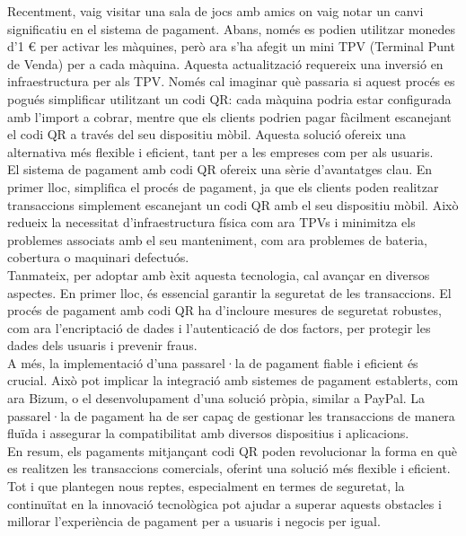 \documentclass[a4paper,12pt,twoside]{ThesisStyle}
\begin{document}
Recentment, vaig visitar una sala de jocs amb amics on vaig notar un canvi significatiu en el sistema de pagament. Abans, només es podien utilitzar monedes d'1 € per activar les màquines, però ara s'ha afegit un mini TPV (Terminal Punt de Venda) per a cada màquina. Aquesta actualització requereix una inversió en infraestructura per als TPV. Només cal imaginar què passaria si aquest procés es pogués simplificar utilitzant un codi QR: cada màquina podria estar configurada amb l'import a cobrar, mentre que els clients podrien pagar fàcilment escanejant el codi QR a través del seu dispositiu mòbil. Aquesta solució ofereix una alternativa més flexible i eficient, tant per a les empreses com per als usuaris.\\


El sistema de pagament amb codi QR ofereix una sèrie d'avantatges clau. En primer lloc, simplifica el procés de pagament, ja que els clients poden realitzar transaccions simplement escanejant un codi QR amb el seu dispositiu mòbil. Això redueix la necessitat d'infraestructura física com ara TPVs i minimitza els problemes associats amb el seu manteniment, com ara problemes de bateria, cobertura o maquinari defectuós.\\

Tanmateix, per adoptar amb èxit aquesta tecnologia, cal avançar en diversos aspectes. En primer lloc, és essencial garantir la seguretat de les transaccions. El procés de pagament amb codi QR ha d'incloure mesures de seguretat robustes, com ara l'encriptació de dades i l'autenticació de dos factors, per protegir les dades dels usuaris i prevenir fraus.\\

A més, la implementació d'una passarel·la de pagament fiable i eficient és crucial. Això pot implicar la integració amb sistemes de pagament establerts, com ara Bizum, o el desenvolupament d'una solució pròpia, similar a PayPal. La passarel·la de pagament ha de ser capaç de gestionar les transaccions de manera fluïda i assegurar la compatibilitat amb diversos dispositius i aplicacions.\\


En resum, els pagaments mitjançant codi QR poden revolucionar la forma en què es realitzen les transaccions comercials, oferint una solució més flexible i eficient. Tot i que plantegen nous reptes, especialment en termes de seguretat, la continuïtat en la innovació tecnològica pot ajudar a superar aquests obstacles i millorar l'experiència de pagament per a usuaris i negocis per igual.\\
\end{document}
